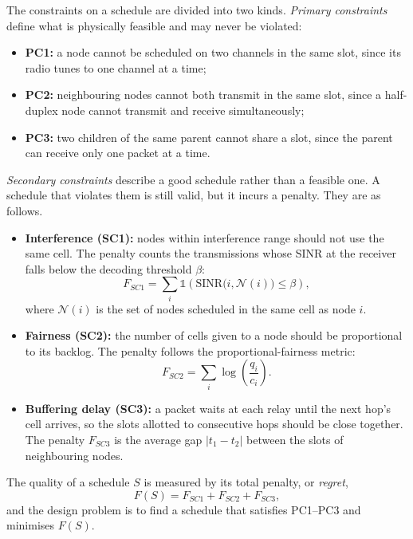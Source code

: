 The constraints on a schedule are divided into two kinds. \emph{Primary constraints} define what is physically feasible and may never be violated:
\begin{itemize}
  \item \textbf{PC1:} a node cannot be scheduled on two channels in the same slot, since its radio tunes to one channel at a time;
  \item \textbf{PC2:} neighbouring nodes cannot both transmit in the same slot, since a half-duplex node cannot transmit and receive simultaneously;
  \item \textbf{PC3:} two children of the same parent cannot share a slot, since the parent can receive only one packet at a time.
\end{itemize}
\emph{Secondary constraints} describe a good schedule rather than a feasible one. A schedule that violates them is still valid, but it incurs a penalty. They are as follows.
\begin{itemize}
  \item \textbf{Interference (SC1):} nodes within interference range should not use the same cell. The penalty counts the transmissions whose SINR at the receiver falls below the decoding threshold $\beta$:
  \begin{equation}
    F_{SC1}=\sum_{i}\mathbb{1}\!\left(\mathrm{SINR}\bigl(i,\mathcal{N}(i)\bigr)\le\beta\right),
  \end{equation}
  where $\mathcal{N}(i)$ is the set of nodes scheduled in the same cell as node $i$.
  \item \textbf{Fairness (SC2):} the number of cells given to a node should be proportional to its backlog. The penalty follows the proportional-fairness metric:
  \begin{equation}
    F_{SC2}=\sum_{i}\log\!\left(\frac{q_i}{c_i}\right).
  \end{equation}
  \item \textbf{Buffering delay (SC3):} a packet waits at each relay until the next hop's cell arrives, so the slots allotted to consecutive hops should be close together. The penalty $F_{SC3}$ is the average gap $|t_1-t_2|$ between the slots of neighbouring nodes.
\end{itemize}
The quality of a schedule $S$ is measured by its total penalty, or \emph{regret},
\begin{equation}
  F(S)=F_{SC1}+F_{SC2}+F_{SC3},
  \label{eq:ml_bios_regret}
\end{equation}
and the design problem is to find a schedule that satisfies PC1--PC3 and minimises $F(S)$.

